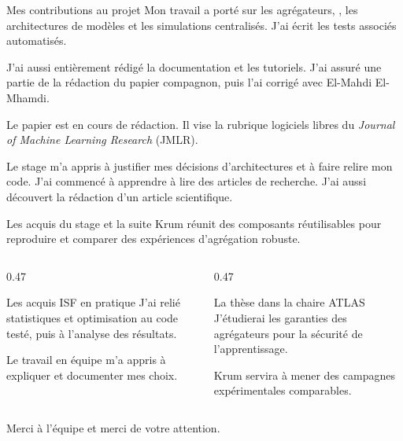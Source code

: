 \begin{frame}{Mes contributions au projet}
    Mon travail a porté sur les agrégateurs, , les architectures de modèles et les
    simulations centralisés. J'ai écrit les tests associés automatisés.

    J'ai aussi entièrement rédigé la documentation et les tutoriels. J'ai
    assuré une partie de la rédaction du papier compagnon, puis l'ai corrigé
    avec El-Mahdi El-Mhamdi.

    \smallskip
    {\small Le papier est en cours de rédaction. Il vise la rubrique logiciels
    libres du \textit{Journal of Machine Learning Research} (JMLR).}

    \medskip
    Le stage m'a appris à justifier mes décisions d'architectures et à faire relire mon code.
    J'ai commencé à apprendre à lire des articles de recherche. J'ai aussi
    découvert la rédaction d'un article scientifique.
\end{frame}

\begin{frame}{Les acquis du stage et la suite}
    Krum réunit des composants réutilisables pour reproduire et comparer
    des expériences d'agrégation robuste.

    \bigskip
    \begin{columns}[T,onlytextwidth]
        \begin{column}{0.47\textwidth}
            \begin{block}{Les acquis ISF en pratique}
                J'ai relié statistiques et optimisation au code testé,
                puis à l'analyse des résultats.

                Le travail en équipe m'a appris à expliquer et documenter mes choix.
            \end{block}
        \end{column}
        \begin{column}{0.47\textwidth}
            \begin{block}{La thèse dans la chaire ATLAS}
                J'étudierai les garanties des agrégateurs pour la sécurité de l'apprentissage.

                Krum servira à mener des campagnes expérimentales comparables.
            \end{block}
        \end{column}
    \end{columns}

    \bigskip
    \centering
    Merci à l'équipe et merci de votre attention.
\end{frame}

